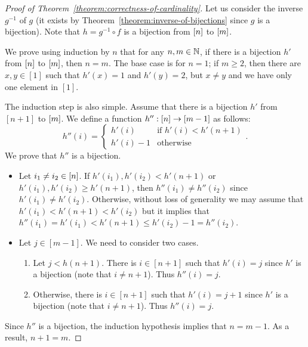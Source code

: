 \begin{proof}[Proof of Theorem~\ref{theorem:correctness-of-cardinality}]
    Let us consider the inverse $g^{-1}$ of $g$ (it exists by
    Theorem~\ref{theorem:inverse-of-bijections} since $g$ is a
    bijection). Note that $h = g^{-1} \circ f$
    is a bijection from ${[{n}]}$ to ${[{m}]}$.

    We prove using induction by $n$ that for any $n, m \in {\mathbb{N}}$,
    if there is a bijection $h'$ from ${[{n}]}$ to ${[{m}]}$, then $n = m$.
    The base case is for $n = 1$; if $m \ge 2$,
    then there are $x, y \in [1]$ such that $h'(x) = 1$ and $h'(y) = 2$, but
    $x \neq y$ and we have only one element in $[1]$.

    The induction step is also simple. Assume that there is a bijection $h'$ from
    $[n + 1]$ to ${[{m}]}$. We define a function
    $h'' : {[{n}]} \to {[{m - 1}]}$ as follows:
    \[
        h''(i) =
        \begin{cases}
            h'(i) & \text{if } h'(i) < h'(n + 1) \\
            h'(i) - 1 & \text{otherwise}
        \end{cases}.
    \]
    We prove that $h''$ is a bijection.
    \begin{itemize}
        \item Let $i_1 \neq i_2 \in {[{n}]}$. If
            $h'(i_1), h'(i_2) < h'(n + 1)$ or $h'(i_1), h'(i_2) \ge h'(n + 1)$,
            then $h''(i_1) \neq h''(i_2)$ since $h'(i_1) \neq h'(i_2)$.
            Otherwise, without loss of generality we may assume that
            $h'(i_1) < h'(n + 1) < h'(i_2)$ but it implies that
            $h''(i_1) = h'(i_1) < h'(n + 1) \le h'(i_2) - 1 = h''(i_2)$.
        \item Let $j \in [m - 1]$. We need to consider two cases.
            \begin{enumerate}
                \item Let $j < h(n + 1)$. There is $i \in [n + 1]$ such that
                    $h'(i) = j$ since $h'$ is a bijection
                    (note that $i \neq n + 1$). Thus $h''(i) = j$.
                \item Otherwise, there is $i \in [n + 1]$ such that
                    $h'(i) = j + 1$ since $h'$ is a bijection
                    (note that $i \neq n + 1$). Thus $h''(i) = j$.
            \end{enumerate}
    \end{itemize}
    Since $h''$ is a bijection, the induction hypothesis implies that
    $n = m - 1$. As a result, $n + 1 = m$.
\end{proof}


